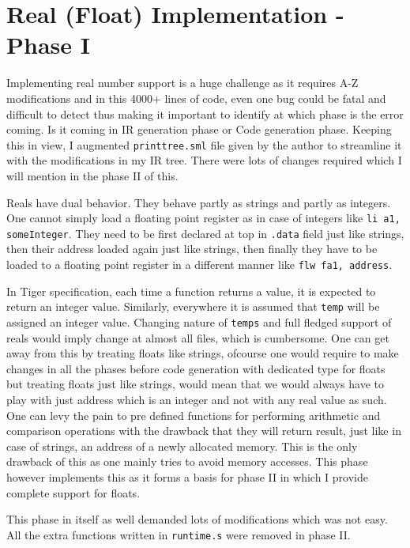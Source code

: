 \section{Real (Float) Implementation - Phase I}

Implementing real number support is a huge challenge as it requires A-Z modifications and in this 4000+ lines of code, even one bug could be fatal and difficult to detect thus making it important to identify at which phase is the error coming. Is it coming in IR generation phase or Code generation phase. Keeping this in view, I augmented \texttt{printtree.sml} file given by the author to streamline it with the modifications in my IR tree. There were lots of changes required which I will mention in the phase II of this.

Reals have dual behavior. They behave partly as strings and partly as integers. One cannot simply load a floating point register as in case of integers like \texttt{li a1, someInteger}. They need to be first declared at top in \texttt{.data} field just like strings, then their address loaded again just like strings, then finally they have to be loaded to a floating point register in a different manner like \texttt{flw fa1, address}. 

In Tiger specification, each time a function returns a value, it is expected to return an integer value. Similarly, everywhere it is assumed that \texttt{temp} will be assigned an integer value. Changing nature of \texttt{temps} and full fledged support of reals would imply change at almost all files, which is cumbersome. One can get away from this by treating floats like strings, ofcourse one would require to make changes in all the phases before code generation with dedicated type for floats but treating floats just like strings, would mean that we would always have to play with just address which is an integer and not with any real value as such. One can levy the pain to pre defined functions for performing arithmetic and comparison operations with the drawback that they will return result, just like in case of strings, an address of a newly allocated memory. This is the only drawback of this as one mainly tries to avoid memory accesses. This phase however implements this as it forms a basis for phase II in which I provide complete support for floats.

This phase in itself as well demanded lots of modifications which was not easy. All the extra functions written in \texttt{runtime.s} were removed in phase II.


